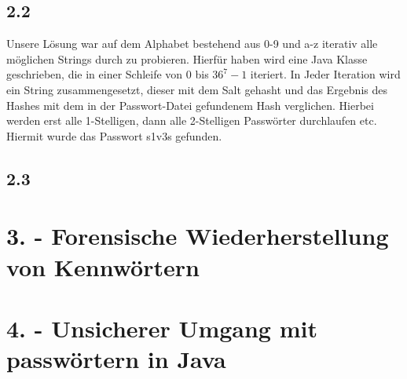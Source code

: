 \documentclass[12pt]{article}
\theoremstyle{plain}
\begin{document}
\begin{linenumbers}
\subsection{2.2}
Unsere Lösung war auf dem Alphabet bestehend aus 0-9 und a-z iterativ alle möglichen Strings durch zu probieren. Hierfür haben wird eine Java Klasse geschrieben, die in einer Schleife von 0 bis $36^7-1$ iteriert. In Jeder Iteration wird ein String zusammengesetzt, dieser mit dem Salt gehasht und das Ergebnis des Hashes mit dem in der Passwort-Datei gefundenem Hash verglichen. Hierbei werden erst alle 1-Stelligen, dann alle 2-Stelligen Passwörter durchlaufen etc. Hiermit wurde das Passwort s1v3s gefunden.
\subsection{2.3}
\section{3. - Forensische Wiederherstellung von Kennwörtern}
\section{4. - Unsicherer Umgang mit passwörtern in Java}
\end{linenumbers}
\end{document}
